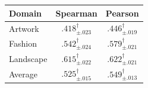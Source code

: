 \begin{tabular}{l cc}
\toprule
Domain & Spearman & Pearson \\
\midrule
Artwork & $.418_{\pm .023}^{\dagger}$ & $.446_{\pm .019}^{\dagger}$ \\
Fashion & $.542_{\pm .024}^{\dagger}$ & $.579_{\pm .021}^{\dagger}$ \\
Landscape & $.615_{\pm .022}^{\dagger}$ & $.622_{\pm .021}^{\dagger}$ \\
Average & $.525_{\pm .015}^{\dagger}$ & $.549_{\pm .013}^{\dagger}$ \\
\bottomrule
\end{tabular}

